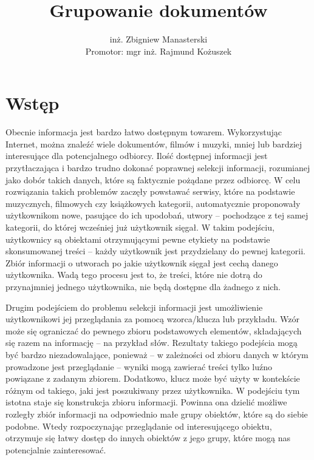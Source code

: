 \documentclass{article}
\title{Grupowanie dokumentów}
\author{inż. Zbigniew Manasterski \\[15pt]\footnotesize Promotor: mgr inż. Rajmund Kożuszek}
\begin{document}
\linespread{1.5}\selectfont

\renewcommand{\labelenumii}{\theenumii}
\renewcommand{\theenumii}{\theenumi.\arabic{enumii}.}
\maketitle

\newpage
\tableofcontents
\newpage

\section{Wstęp}
Obecnie informacja jest bardzo łatwo dostępnym towarem. Wykorzystując Internet, można znaleźć wiele dokumentów, filmów i muzyki, mniej lub bardziej interesujące dla potencjalnego odbiorcy. Ilość dostępnej informacji jest przytłaczająca i bardzo trudno dokonać poprawnej selekcji informacji, rozumianej jako dobór takich danych, które są faktycznie pożądane przez odbiorcę. W celu rozwiązania takich problemów zaczęły powstawać serwisy, które na podstawie muzycznych, filmowych czy książkowych kategorii, automatycznie proponowały użytkownikom nowe, pasujące do ich upodobań, utwory – pochodzące z tej samej kategorii, do której wcześniej już użytkownik sięgał. W takim podejściu, użytkownicy są obiektami otrzymującymi pewne etykiety na podstawie skonsumowanej treści – każdy użytkownik jest przydzielany do pewnej kategorii. Zbiór informacji o utworach po jakie użytkownik sięgał jest cechą danego użytkownika. Wadą tego procesu jest to, że treści, które nie dotrą do przynajmniej jednego użytkownika, nie będą dostępne dla żadnego z nich.

Drugim podejściem do problemu selekcji informacji jest umożliwienie użytkownikowi jej przeglądania za pomocą wzorca/klucza lub przykładu. Wzór może się ograniczać do pewnego zbioru podstawowych elementów, składających się razem na informację – na przykład słów. Rezultaty takiego podejścia mogą być bardzo niezadowalające, ponieważ – w zależności od zbioru danych w którym prowadzone jest przeglądanie – wyniki mogą zawierać treści tylko luźno powiązane z zadanym zbiorem. Dodatkowo, klucz może być użyty w kontekście różnym od takiego, jaki jest poszukiwany przez użytkownika. W podejściu tym istotna staje się konstrukcja zbioru informacji. Powinna ona dzielić możliwe rozległy zbiór informacji na odpowiednio małe grupy obiektów, które są do siebie podobne. Wtedy rozpoczynając przeglądanie od interesującego obiektu, otrzymuje się łatwy dostęp do innych obiektów z jego grupy, które mogą nas potencjalnie zainteresować.
\end{document}
